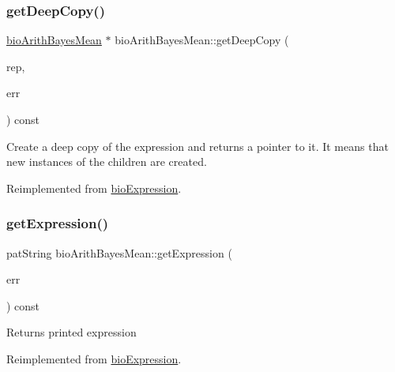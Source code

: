\subsubsection{\texorpdfstring{get\+Deep\+Copy()}{getDeepCopy()}}
{\footnotesize\ttfamily \hyperlink{classbio_arith_bayes_mean}{bio\+Arith\+Bayes\+Mean} $\ast$ bio\+Arith\+Bayes\+Mean\+::get\+Deep\+Copy (\begin{DoxyParamCaption}\item[{\hyperlink{classbio_expression_repository}{bio\+Expression\+Repository} $\ast$}]{rep,  }\item[{pat\+Error $\ast$\&}]{err }\end{DoxyParamCaption}) const\hspace{0.3cm}{\ttfamily [virtual]}}

Create a deep copy of the expression and returns a pointer to it. It means that new instances of the children are created. 

Reimplemented from \hyperlink{classbio_expression_a4ee1b8add634078a02eaae26cd40dcc8}{bio\+Expression}.

\mbox{\label{classbio_arith_bayes_mean_a334b29ea459dc9f8943f888595dc4aa5}} 
\subsubsection{\texorpdfstring{get\+Expression()}{getExpression()}}
{\footnotesize\ttfamily pat\+String bio\+Arith\+Bayes\+Mean\+::get\+Expression (\begin{DoxyParamCaption}\item[{pat\+Error $\ast$\&}]{err }\end{DoxyParamCaption}) const\hspace{0.3cm}{\ttfamily [virtual]}}

\begin{DoxyReturn}{Returns}
printed expression 
\end{DoxyReturn}


Reimplemented from \hyperlink{classbio_expression_a66a83eb0caac18dd5e568ffde5a8b5d4}{bio\+Expression}.

\mbox{\label{classbio_arith_bayes_mean_a240a65d98274bae45da8203db5a96754}} 
